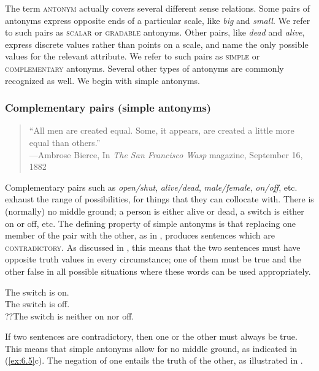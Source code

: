 The term \textsc{antonym} actually covers several different sense relations. Some pairs of antonyms express opposite ends of a particular scale, like \textit{big} and \textit{small}. We refer to such pairs as \textsc{scalar} or \textsc{gradable} antonyms. Other pairs, like \textit{dead} and \textit{alive}, express discrete values rather than points on a scale, and name the only possible values for the relevant attribute. We refer to such pairs as \textsc{simple} or \textsc{complementary} antonyms. Several other types of antonyms are commonly recognized as well. We begin with simple antonyms.


\subsubsection{Complementary pairs (simple antonyms)}\label{sec:} %
\begin{quote}
“All men are created equal. Some, it appears, are created a little more equal than others.”\\
—Ambrose Bierce, In \textit{The San Francisco Wasp} magazine, September 16, 1882
\end{quote}


Complementary pairs such as \textit{open/shut}, \textit{alive/dead}, \textit{male/female}, \textit{on/off}, etc. exhaust the range of possibilities, for things that they can collocate with. There is (normally) no middle ground; a person is either alive or dead, a switch is either on or off, etc. The defining property of simple antonyms is that replacing one member of the pair with the other, as in , produces sentences which are \textsc{contradictory.} As discussed in , this means that the two sentences must have opposite truth values in every circumstance; one of them must be true and the other false in all possible situations where these words can be used appropriately.


\ea \label{ex:6.5}
\ea The switch is on.\\
\ex The switch is off.\\
\ex ??The switch is neither on nor off.
                       \z
\z


If two sentences are contradictory, then one or the other must always be true. This means that simple antonyms allow for no middle ground, as indicated in (\ref{ex:6.5}c). The negation of one entails the truth of the other, as illustrated in .


\ea \label{ex:6.6}
                       \z
\z


